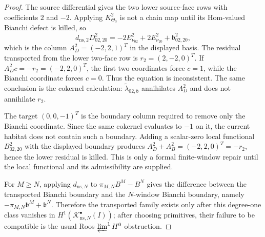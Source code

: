 \begin{proof}
  The source differential gives the two lower source-face rows with
  coefficients \(2\) and \(-2\).  Applying \(K^2_{\Theta_3}\) is not a
  chain map until its Hom-valued Bianchi defect is killed, so
  \[
    d_{\mathrm{ns},2}D^2_{02,20}
      =
    -2E^2_{\nu_{02}}+2E^2_{\nu_{20}}
      +\mathfrak b^2_{02,20},
  \]
  which is the column \(A_D^2=(-2,2,1)^T\) in the displayed basis.  The
  residual transported from the lower two-face row is \(r_2=(2,-2,0)^T\).
  If \(A_D^2c=-r_2=(-2,2,0)^T\), the first two coordinates force
  \(c=1\), while the Bianchi coordinate forces \(c=0\).  Thus the equation
  is inconsistent.  The same conclusion is the cokernel calculation:
  \(\widetilde\lambda_{02,\mathfrak b}\) annihilates \(A_D^2\) and does
  not annihilate \(r_2\).

  The target \((0,0,-1)^T\) is the boundary column required to remove
  only the Bianchi coordinate.  Since the same cokernel evaluates to
  \(-1\) on it, the current habitat does not contain such a boundary.
  Adding a scalar-zero local functional \(B^2_{02,20}\) with the displayed
  boundary produces
  \(A_D^2+A_B^2=(-2,2,0)^T=-r_2\), hence the lower residual is killed.
  This is only a formal finite-window repair until the local functional
  and its admissibility are supplied.

  For \(M\ge N\), applying \(d_{\mathrm{ns},N}\) to
  \(\pi_{M,N}B^M-B^N\) gives the difference between the transported
  Bianchi boundary and the \(N\)-window Bianchi boundary, namely
  \(-\pi_{M,N}\mathfrak b^M+\mathfrak b^N\).  Therefore the transported
  family exists only after this degree-one class vanishes in
  \(H^1(\mathcal K^\bullet_{\mathrm{ns},N}(I))\); after choosing
  primitives, their failure to be compatible is the usual Roos
  \(\varprojlim^1H^0\) obstruction.
\end{proof}

